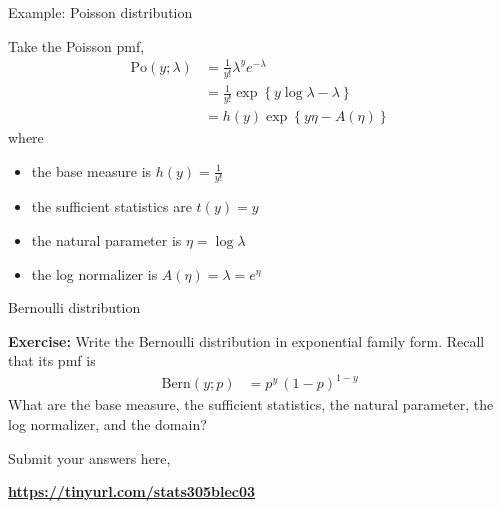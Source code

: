 \documentclass[aspectratio=169]{beamer}
\begin{document}
\begin{frame}[t,allowframebreaks]{Example: Poisson distribution}\label{poisson-distribution}

Take the Poisson pmf, \begin{align*}
    \mathrm{Po}(y; \lambda) 
    &= \frac{1}{y!} \lambda^{y} e^{-\lambda} \\
    &= \frac{1}{y!} \exp \left\{ y \log \lambda - \lambda \right \} \\
    &= h(y) \exp \left\{ y \eta - A(\eta) \right \} 
\end{align*} 
where 
\begin{itemize}
    \item the base measure is \(h(y) = \frac{1}{y!}\) 
    \item the sufficient statistics are \(t(y) = y\) 
    \item the natural parameter is \(\eta = \log \lambda\) 
    \item the log normalizer is \(A(\eta) = \lambda = e^\eta\) %
\end{itemize}
\end{frame}

\begin{frame}[t,allowframebreaks]{Bernoulli distribution}\label{bernoulli-distribution}

\textbf{Exercise:} Write the Bernoulli distribution in
exponential family form. Recall that its pmf is \begin{align*}
    \mathrm{Bern}(y; p) &= p^{y} \, (1-p)^{1 - y} 
\end{align*} What are the base measure, the sufficient statistics, the
natural parameter, the log normalizer, and the domain? 

Submit your answers here,
\begin{center}
    \textbf{\textcolor{blue}{\url{https://tinyurl.com/stats305blec03}}}
\end{center}
\end{frame}
\end{document}
